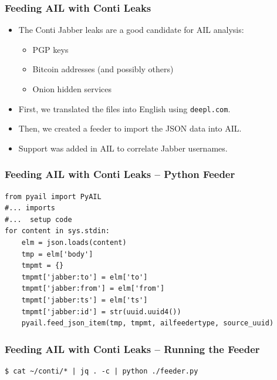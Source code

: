 \documentclass[10pt,aspectratio=169, colorlinks=true, linkcolor=circlBlue]{beamer}
\begin{document}
\begin{frame}[fragile]
    \frametitle{Feeding AIL with Conti Leaks}

    \begin{itemize}
        \item The Conti Jabber leaks are a good candidate for AIL analysis:
        \begin{itemize}
            \item PGP keys
            \item Bitcoin addresses (and possibly others)
            \item Onion hidden services
        \end{itemize}

        \item First, we translated the files into English using \texttt{deepl.com}.
        \item Then, we created a feeder to import the JSON data into AIL.
        \item Support was added in AIL to correlate Jabber usernames.
    \end{itemize}
\end{frame}

\begin{frame}[fragile]
    \frametitle{Feeding AIL with Conti Leaks – Python Feeder}

    \begin{tcolorbox}[colback=black!85, coltext=green, title=feeder.py, fonttitle=\bfseries, arc=2mm, boxrule=0.4pt]
\begin{verbatim}
from pyail import PyAIL
#... imports
#...  setup code
for content in sys.stdin:
    elm = json.loads(content)
    tmp = elm['body']
    tmpmt = {}
    tmpmt['jabber:to'] = elm['to']
    tmpmt['jabber:from'] = elm['from']
    tmpmt['jabber:ts'] = elm['ts']
    tmpmt['jabber:id'] = str(uuid.uuid4())
    pyail.feed_json_item(tmp, tmpmt, ailfeedertype, source_uuid)
\end{verbatim}
    \end{tcolorbox}

\end{frame}


\begin{frame}[fragile]
    \frametitle{Feeding AIL with Conti Leaks – Running the Feeder}

    \begin{tcolorbox}[colback=black!85, coltext=green, title=Run the feeder with Conti leaks, fonttitle=\bfseries, arc=2mm, boxrule=0.4pt]
\begin{verbatim}
$ cat ~/conti/* | jq . -c | python ./feeder.py
\end{verbatim}
    \end{tcolorbox}

\end{frame}
\end{document}
